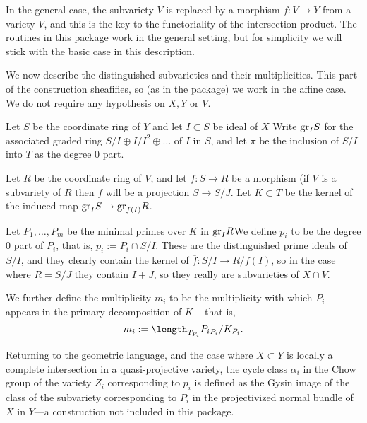 \documentclass[twoside,12pt, leqno]{amsart}
\def\gr{{\rm gr}}
\begin{document}
In the general case, the subvariety $V$ is replaced by a morphism $f:V\to Y$ from a variety $V$, and this is the key to the functoriality of the intersection product. The routines in this package work in the general setting, but for simplicity we will stick with the basic case in this description.

We now describe the distinguished subvarieties and their multiplicities. This part of the construction sheafifies, so (as in the package) we work in the affine case. We do not require any hypothesis on $X, Y$ or $V$. 

Let $S$ be the coordinate ring of $Y$ and let $I\subset S$ be  ideal of $X$
Write
$
\gr_{I}S
$ for the associated graded ring $S/I\oplus I/I^{2}\oplus\dots$ of $I$ in $S$, and let
$\pi$ be the inclusion of $S/I$ into $T$ as the degree 0 part.

Let $R$ be the coordinate ring of $V$, and let $f:S\to R$ be a morphism (if $V$ is a subvariety of $R$ then $f$ will be a projection  $S\to S/J$. Let $K\subset T$ be the kernel of the induced map $ \gr_{I}S \to \gr_{f(I)}R$.  

Let $P_{1},\dots, P_{m}$ be the minimal primes over $K$ in $\gr_{I}R$We define $p_{i}$ to be the degree 0 part of $P_{i}$, that is, $p_{i} := P_{i}\cap S/I$. These are the distinguished prime ideals of $S/I$, and they clearly contain the kernel of $\overline f: S/I \to R/f(I)$, so in the case where $R = S/J$ they contain $I+J$, so they really are subvarieties
of $X\cap V$.

We further define the multiplicity $m_{i}$ to be the multiplicity with which $P_{i}$ appears in the primary decomposition of $K$ -- that is,
$$
m_{i} := \length_{T_{P_{i}}}{P_{i}}_{P_{i}}/K_{P_{i}}.
$$

Returning to the geometric language, and the case where $X\subset Y$ is locally a complete intersection in a quasi-projective variety, the cycle class $\alpha_{i}$ in the Chow group of the variety 
$Z_{i}$ corresponding to $p_{i}$ is defined as the Gysin image of the class of the subvariety corresponding
to $P_{i}$ in the projectivized normal bundle of $X$ in $Y$---a construction not included in this package. 
\end{document}
